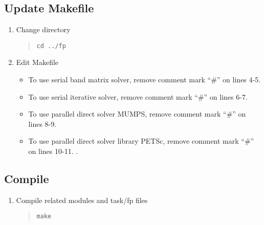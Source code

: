 \documentclass[11pt]{article}
\begin{document}
\subsection{Update Makefile}
\begin{enumerate}
\item
Change directory
\begin{quote}
\begin{verbatim}
cd ../fp
\end{verbatim}
\end{quote}
\item
Edit Makefile
\begin{itemize}
\item
To use serial band matrix solver, remove comment mark ``\#'' on lines 4-5.
\item
To use serial iterative solver, remove comment mark ``\#'' on lines 6-7.
\item
To use parallel direct solver MUMPS, remove comment mark ``\#'' on lines 8-9.
\item
To use parallel direct solver library PETSc, remove comment mark ``\#''
on lines 10-11. .
\end{itemize}
\end{enumerate}

\subsection{Compile}
\begin{enumerate}
\item
Compile related modules and task/fp files
\begin{quote}
\begin{verbatim}
make
\end{verbatim}
\end{quote}
\end{enumerate}
\end{document}
